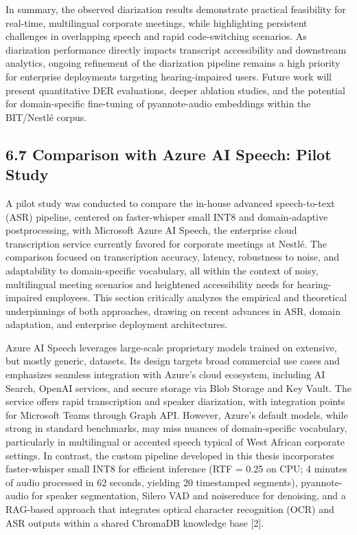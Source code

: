 \documentclass[12pt,a4paper]{article}
\begin{document}
In summary, the observed diarization results demonstrate practical feasibility for real-time, multilingual corporate meetings, while highlighting persistent challenges in overlapping speech and rapid code-switching scenarios. As diarization performance directly impacts transcript accessibility and downstream analytics, ongoing refinement of the diarization pipeline remains a high priority for enterprise deployments targeting hearing-impaired users. Future work will present quantitative DER evaluations, deeper ablation studies, and the potential for domain-specific fine-tuning of pyannote-audio embeddings within the BIT/Nestlé corpus.


\subsection{6.7 Comparison with Azure AI Speech: Pilot Study}


A pilot study was conducted to compare the in-house advanced speech-to-text (ASR) pipeline, centered on faster-whisper small INT8 and domain-adaptive postprocessing, with Microsoft Azure AI Speech, the enterprise cloud transcription service currently favored for corporate meetings at Nestlé. The comparison focused on transcription accuracy, latency, robustness to noise, and adaptability to domain-specific vocabulary, all within the context of noisy, multilingual meeting scenarios and heightened accessibility needs for hearing-impaired employees. This section critically analyzes the empirical and theoretical underpinnings of both approaches, drawing on recent advances in ASR, domain adaptation, and enterprise deployment architectures.


Azure AI Speech leverages large-scale proprietary models trained on extensive, but mostly generic, datasets. Its design targets broad commercial use cases and emphasizes seamless integration with Azure's cloud ecosystem, including AI Search, OpenAI services, and secure storage via Blob Storage and Key Vault. The service offers rapid transcription and speaker diarization, with integration points for Microsoft Teams through Graph API. However, Azure's default models, while strong in standard benchmarks, may miss nuances of domain-specific vocabulary, particularly in multilingual or accented speech typical of West African corporate settings. In contrast, the custom pipeline developed in this thesis incorporates faster-whisper small INT8 for efficient inference (RTF = 0.25 on CPU; 4 minutes of audio processed in 62 seconds, yielding 20 timestamped segments), pyannote-audio for speaker segmentation, Silero VAD and noisereduce for denoising, and a RAG-based approach that integrates optical character recognition (OCR) and ASR outputs within a shared ChromaDB knowledge base [2].
\end{document}
